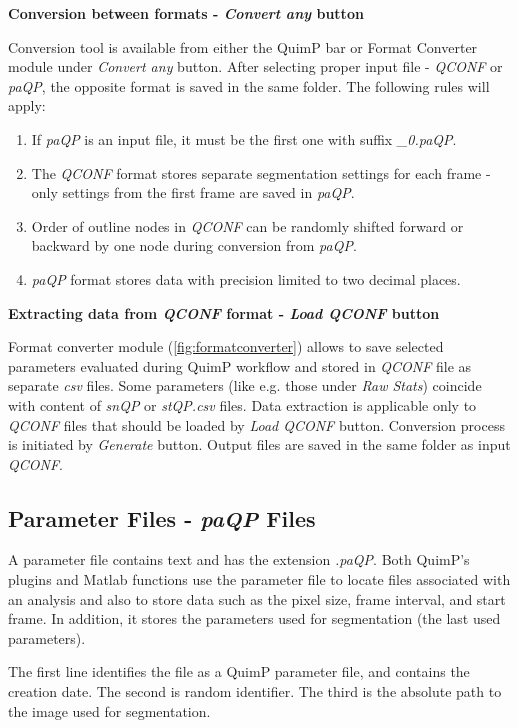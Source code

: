 \documentclass[a4paper,12pt]{article}
\begin{document}
\textbf{Conversion between formats - \textit{Convert any} button}

Conversion tool is available from either the QuimP bar or Format Converter module under \textit{Convert any} button. After selecting proper input file - \textit{QCONF} or \textit{paQP}, the opposite format is saved in the same folder. The following rules will apply:
\begin{enumerate}
	\item If \textit{paQP} is an input file, it must be the first one with suffix \textit{\_0.paQP}.
	\item The \textit{QCONF} format stores separate segmentation settings for each frame - only settings from the first frame are saved in \textit{paQP}. 
	\item Order of outline nodes in \textit{QCONF} can be randomly shifted forward or backward by one node during conversion from \textit{paQP}. 
	\item \textit{paQP} format stores data with precision limited to two decimal places.
\end{enumerate}

\textbf{Extracting data from \textit{QCONF} format - \textit{Load QCONF} button}

Format converter module (\autoref{fig:formatconverter}) allows to save selected parameters evaluated during QuimP workflow and stored in \textit{QCONF} file as separate \textit{csv} files. Some parameters (like e.g. those under \textit{Raw Stats}) coincide with content of \textit{snQP} or \textit{stQP.csv} files. Data extraction is applicable only to \textit{QCONF} files that should be loaded by \textit{Load QCONF} button. Conversion process is initiated by \textit{Generate} button. Output files are saved in the same folder as input \textit{QCONF}.    
  
\subsection{Parameter Files - \textit{paQP} Files}
\label{paQP}

A parameter file contains text and has the extension \textit{.paQP}.  Both QuimP's plugins and
Matlab functions use the parameter file to locate files associated with an analysis and also to store data such as the
pixel size, frame interval, and start frame.  In addition, it stores the parameters used for segmentation
(the last used parameters).

The first line identifies the file as a QuimP parameter file, and contains the creation date.
The second is random identifier.
The third is the absolute path to the image used for segmentation.
 
\end{document}
